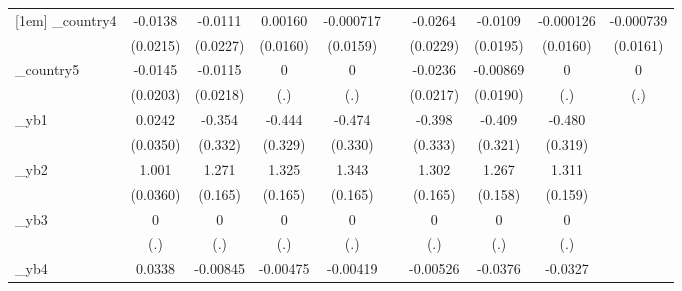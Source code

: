 \begin{table}[htbp]
\begin{tabular}{l*{9}{c}}
[1em]
\_country4   &     -0.0138         &     -0.0111         &     0.00160         &   -0.000717         &                     &     -0.0264         &     -0.0109         &   -0.000126         &   -0.000739         \\
            &    (0.0215)         &    (0.0227)         &    (0.0160)         &    (0.0159)         &                     &    (0.0229)         &    (0.0195)         &    (0.0160)         &    (0.0161)         \\
[1em]
\_country5   &     -0.0145         &     -0.0115         &           0         &           0         &                     &     -0.0236         &    -0.00869         &           0         &           0         \\
            &    (0.0203)         &    (0.0218)         &         (.)         &         (.)         &                     &    (0.0217)         &    (0.0190)         &         (.)         &         (.)         \\
[1em]
\_yb1        &      0.0242         &      -0.354         &      -0.444         &      -0.474         &                     &      -0.398         &      -0.409         &      -0.480         &                     \\
            &    (0.0350)         &     (0.332)         &     (0.329)         &     (0.330)         &                     &     (0.333)         &     (0.321)         &     (0.319)         &                     \\
[1em]
\_yb2        &       1.001\sym{***}&       1.271\sym{***}&       1.325\sym{***}&       1.343\sym{***}&                     &       1.302\sym{***}&       1.267\sym{***}&       1.311\sym{***}&                     \\
            &    (0.0360)         &     (0.165)         &     (0.165)         &     (0.165)         &                     &     (0.165)         &     (0.158)         &     (0.159)         &                     \\
[1em]
\_yb3        &           0         &           0         &           0         &           0         &                     &           0         &           0         &           0         &                     \\
            &         (.)         &         (.)         &         (.)         &         (.)         &                     &         (.)         &         (.)         &         (.)         &                     \\
[1em]
\_yb4        &      0.0338         &    -0.00845         &    -0.00475         &    -0.00419         &                     &    -0.00526         &     -0.0376         &     -0.0327         &                     \\

\end{tabular}
\end{table}
